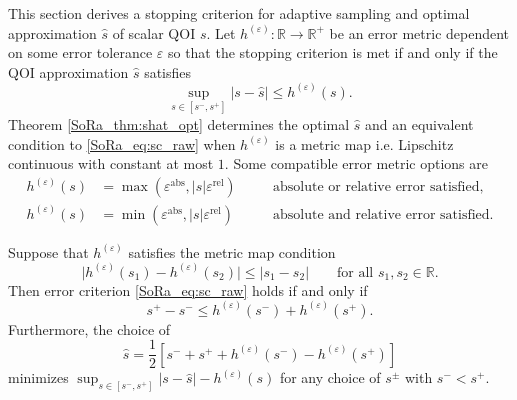 \documentclass[graybox]{svmult}
\begin{document}
This section derives a stopping criterion for adaptive sampling and optimal approximation $\hat{s}$ of scalar QOI $s$. Let $h^{(\varepsilon)}: \mathbb{R} \to \mathbb{R}^+$ be an error metric dependent on some error tolerance $\varepsilon$ so that the stopping criterion is met if and only if the QOI approximation $\hat{s}$ satisfies 
\begin{equation}
    \sup_{s \in [s^-,s^+]} \lvert s-\hat{s} \rvert \leq h^{(\varepsilon)}(s).
    \label{SoRa_eq:sc_raw}
\end{equation}
Theorem \ref{SoRa_thm:shat_opt} determines the optimal $\hat{s}$ and an equivalent condition to \eqref{SoRa_eq:sc_raw} when $h^{(\varepsilon)}$ is a metric map i.e. Lipschitz continuous with constant at most $1$. Some compatible error metric options are
\begin{subequations}
\begin{align}
    h^{(\varepsilon)}(s) &= \max\left(\varepsilon^\text{abs},\lvert s \rvert \varepsilon^\text{rel} \right) \quad &&\text{absolute or relative error satisfied,} \label{SoRa_eq:h_abs_or_rel} \\
    h^{(\varepsilon)}(s) &= \min\left(\varepsilon^\text{abs},\lvert s \rvert \varepsilon^\text{rel} \right) \quad &&\text{absolute and relative error satisfied.} \label{SoRa_eq:h_abs_and_rel}
\end{align}
\end{subequations}
\begin{theorem} \label{SoRa_thm:shat_opt}
    Suppose that  $h^{(\varepsilon)}$ satisfies the metric map condition
    \begin{equation}
        \lvert h^{(\varepsilon)}(s_1) - h^{(\varepsilon)}(s_2) \rvert \leq \lvert s_1 - s_2 \rvert \qquad \text{for all } s_1,s_2 \in \mathbb{R}.
        \label{SoRa_eq:metric_map_cond}
    \end{equation}
    Then error criterion  \eqref{SoRa_eq:sc_raw} holds if and only if 
    \begin{equation}
        s^+-s^- \leq h^{(\varepsilon)}(s^-)+h^{(\varepsilon)}(s^+).
        \label{SoRa_eq:sc}
    \end{equation}
    Furthermore, the choice of 
    \begin{equation}
        \hat{s} = \frac{1}{2}\left[s^-+s^++h^{(\varepsilon)}(s^-)-h^{(\varepsilon)}(s^+)\right]
        \label{SoRa_eq:shat_opt}
    \end{equation}
    minimizes $\sup_{s \in [s^-,s^+]} \lvert s - \hat{s} \rvert -h^{(\varepsilon)}(s)$ for any choice of $s^{\pm}$ with $s^- < s^+$.
\end{theorem}
\end{document}
